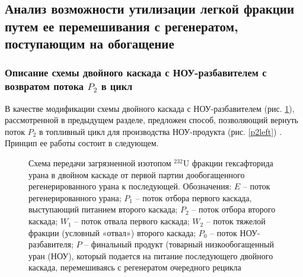 \subsection{Анализ возможности утилизации легкой фракции путем ее перемешивания с регенератом, поступающим на обогащение}

\subsubsection{Описание схемы двойного каскада с НОУ-разбавителем с возвратом потока $P_2$ в цикл}

В качестве модификации схемы двойного каскада с НОУ-разбавителем (рис. \ref{P2utilizationRing}), рассмотренной в предыдущем разделе, предложен способ, позволяющий вернуть поток $P_2$ в топливный цикл для производства НОУ-продукта (рис. \ref{p2left}) \cite{nevinicaToplivnyyCiklLegkovodnogo2019, nevinicaSposobIzotopnogoVosstanovleniya2019}. Принцип ее работы состоит в следующем.

\begin{figure}[ht]
    \caption{Схема передачи загрязненной изотопом $^{232}$U фракции гексафторида урана в двойном каскаде от первой партии дообогащенного регенерированного урана к последующей. Обозначения: $E$ -- поток регенерированного урана; $P_1$ -- поток отбора первого каскада, выступающий питанием второго каскада; $P_2$ -- поток отбора второго каскада; $W_1$ -- поток отвала первого каскада; $W_2$ -- поток тяжелой фракции (условный «отвал») второго каскада; $P_0$ -- поток НОУ-разбавителя; $P$ -- финальный продукт (товарный низкообогащенный уран (НОУ), который подается на питание последующего двойного каскада, перемешиваясь с регенератом очередного рецикла}\label{P2utilizationRing}
\end{figure}

